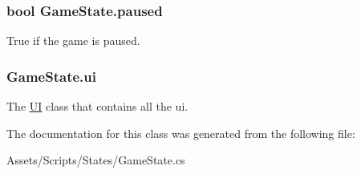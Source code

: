 \hypertarget{class_game_state_adf311d7d919e9b18af99cfb91060b325}{
\subsubsection[{paused}]{\setlength{\rightskip}{0pt plus 5cm}bool Game\-State.\-paused\hspace{0.3cm}{\ttfamily [protected]}}}\label{class_game_state_adf311d7d919e9b18af99cfb91060b325}


True if the game is paused.

\hypertarget{class_game_state_a60e73f2ff4aa85124129d5ab6331a0c4}{
\subsubsection[{ui}]{ Game\-State.\-ui\hspace{0.3cm}{\ttfamily [protected]}}}\label{class_game_state_a60e73f2ff4aa85124129d5ab6331a0c4}


The \hyperlink{class_u_i}{U\-I} class that contains all the ui.



The documentation for this class was generated from the following file\-:\begin{DoxyCompactItemize}
\item 
Assets/\-Scripts/\-States/Game\-State.\-cs\end{DoxyCompactItemize}
